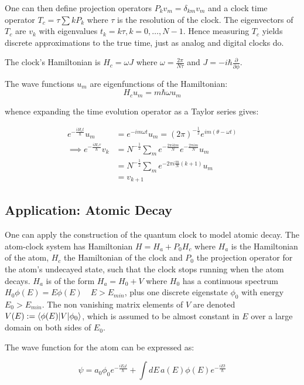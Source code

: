 \documentclass{article}
\begin{document}
\noindent One can then define projection operators $P_kv_m=\delta_{km}v_m$ and a clock time operator $T_c = \tau\sum{kP_k}$ where $\tau$ is the resolution of the clock. The eigenvectors of $T_c$ are $v_k$ with eigenvalues $t_k = k\tau, k=0,\dots,N-1$. Hence measuring $T_c$ yields discrete approximations to the true time, just as analog and digital clocks do. 

\noindent The clock's Hamiltonian is $H_c = \omega J$ where $\omega = \frac{2\pi}{N\tau}$ and $J=-i\hbar \frac{\partial}{\partial\phi}$.

\noindent The wave functions $u_m$ are eigenfunctions of the Hamiltonian:
\[
H_cu_m = m\hbar\omega u_m
\] 

\noindent whence expanding the time evolution operator as a Taylor series gives:

\begin{align}
	e^{-\frac{iH_ct}{\hbar}}u_m &= e^{-im\omega t}u_m = (2\pi)^{-\frac{1}{2}}e^{im(\theta-\omega t)} \\
	\implies e^{-\frac{iH_c\tau}{\hbar}}v_k &= N^{-\frac{1}{2}}\sum_{m}e^{-\frac{2\pi ikm}{N}}e^{-\frac{2\pi im}{N}}u_m \\
						       &= N^{-\frac{1}{2}}\sum_{m}e^{-2\pi i \frac{m}{N}(k+1)}u_m \\
						       &= v_{k+1}
\end{align}

\subsection{Application: Atomic Decay}
One can apply the construction of the quantum clock to model atomic decay. The atom-clock system has Hamiltonian $H=H_a+P_0H_c$ where $H_a$ is the Hamiltonian of the atom, $H_c$ the Hamiltonian of the clock and $P_0$ the projection operator for the atom's undecayed state, such that the clock stops running when the atom decays. $H_a$ is of the form $H_a=H_0+V$ where $H_0$ has a continuous spectrum $H_0\phi(E) = E\phi(E) \quad E>E_{min}$, plus one discrete eigenstate $\phi_0$ with energy $E_0>E_{min}$. The non vanishing matrix elements of $V$ are denoted $V(E) := \braket{\phi(E)|V|\phi_0}$, which is assumed to be almost constant in $E$ over a large domain on both sides of $E_0$.

\noindent The wave function for the atom can be expressed as:

\begin{equation}
	\psi = a_0\phi_0e^{-\frac{iE_0t}{\hbar}}+\int dE\, a(E)\phi(E)e^{-\frac{iEt}{\hbar}}
\end{equation}
\end{document}
